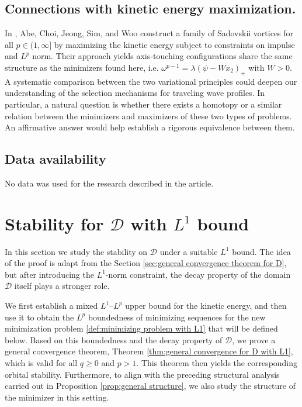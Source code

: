 \documentclass[11pt,letterpaper]{amsart}
\theoremstyle{definition}
\theoremstyle{remark}
\newcommand{\D}{\mathcal{D}}
\numberwithin{equation}{section}
\begin{document}
\subsection{Connections with kinetic energy maximization.}

In \cite{abe2025existence}, Abe, Choi, Jeong, Sim, and Woo construct a family of Sadovskii vortices for all $p\in(1,\infty]$ by maximizing the kinetic energy subject to constraints on impulse and $L^p$ norm. Their approach yields axis‑touching configurations share the same structure as the minimizers found here, i.e. $\omega^{p-1} = \lambda(\psi - W x_2)_+$ with $W>0$. A systematic comparison between the two variational principles
could deepen our understanding of the selection mechanisms for traveling wave profiles. In particular, a natural question is whether there exists a homotopy or a similar relation between the minimizers and maximizers of these two types of problems. An affirmative answer would help establish a rigorous equivalence between them.

\subsection*{Data availability}
No data was used for the research described in the article.

\appendix

\section{Stability for $\D$ with $L^1$ bound}\label{sec:stability for D with L1 bound}

In this section we study the stability on $\D$ under a suitable $L^1$ bound. The idea of the proof is adapt from the Section \ref{sec:general convergence theorem for D}, but after introducing the $L^1$-norm constraint, the decay property of the domain $\D$ itself plays a stronger role. 

We first establish a mixed $L^1$–$L^p$ upper bound for the kinetic energy, and then use it to obtain the $L^p$ boundedness of minimizing sequences for the new minimization problem \eqref{def:minimizing problem with L1} that will be defined below. Based on this boundedness and the decay property of $\D$, we prove a general convergence theorem, Theorem \ref{thm:general convergence for D with L1}, which is valid for all $q\ge 0$ and $p>1$. This theorem then yields the corresponding orbital stability. Furthermore, to align with the preceding structural analysis carried out in Proposition \ref{prop:general structure}, we also study the structure of the minimizer in this setting.
\end{document}
